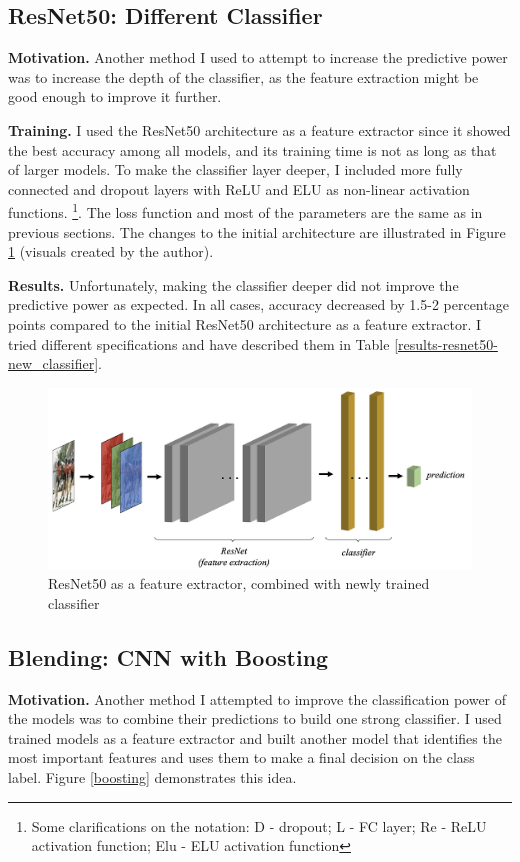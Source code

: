 \documentclass[reqno]{article}
\begin{document}
\subsection{ResNet50: Different Classifier}

\textbf{Motivation.} Another method I used to attempt to increase the predictive power was to increase the depth of the classifier, as the feature extraction might be good enough to improve it further.

\textbf{Training.} I used the ResNet50 architecture as a feature extractor since it showed the best accuracy among all models, and its training time is not as long as that of larger models. To make the classifier layer deeper, I included more fully connected and dropout layers with ReLU and ELU as non-linear activation functions. \footnote{Some clarifications on the notation: D - dropout; L - FC layer; Re - ReLU activation function; Elu - ELU activation function}. The loss function and most of the parameters are the same as in previous sections. The changes to the initial architecture are illustrated in Figure \ref{feature_extraction} (visuals created by the author).

\textbf{Results.} Unfortunately, making the classifier deeper did not improve the predictive power as expected. In all cases, accuracy decreased by 1.5-2 percentage points compared to the initial ResNet50 architecture as a feature extractor. I tried different specifications and have described them in Table \ref{results-resnet50-new_classifier}.

	\begin{figure}[ht]
		\centering
		\includegraphics[width=0.7\linewidth]{CNN_feature_exct}
		\caption{ResNet50 as a feature extractor, combined with newly trained classifier}
		\label{feature_extraction}
	\end{figure}

\subsection{Blending: CNN with Boosting}

\textbf{Motivation.} Another method I attempted to improve the classification power of the models was to combine their predictions to build one strong classifier. I used trained models as a feature extractor and built another model that identifies the most important features and uses them to make a final decision on the class label. Figure \ref{boosting} demonstrates this idea.
\end{document}
